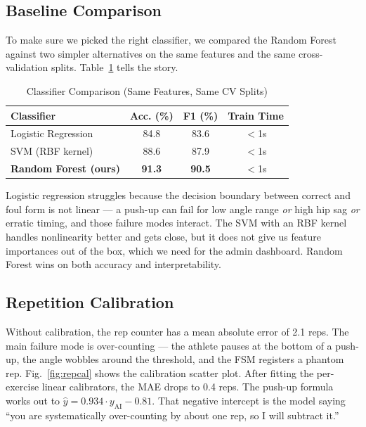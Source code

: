 \documentclass[conference]{IEEEtran}
\begin{document}
\subsection{Baseline Comparison}

To make sure we picked the right classifier, we compared the Random Forest against two simpler alternatives on the same features and the same cross-validation splits. Table~\ref{tab:baselines} tells the story.

\begin{table}[ht]
\caption{Classifier Comparison (Same Features, Same CV Splits)}
\label{tab:baselines}
\centering
\renewcommand{\arraystretch}{1.15}
\begin{tabular}{@{}lccc@{}}
\toprule
\textbf{Classifier} & \textbf{Acc. (\%)} & \textbf{F1 (\%)} & \textbf{Train Time} \\
\midrule
Logistic Regression & 84.8 & 83.6 & $<$1s \\
SVM (RBF kernel) & 88.6 & 87.9 & $<$1s \\
\textbf{Random Forest (ours)} & \textbf{91.3} & \textbf{90.5} & $<$1s \\
\bottomrule
\end{tabular}
\end{table}

Logistic regression struggles because the decision boundary between correct and foul form is not linear --- a push-up can fail for low angle range \textit{or} high hip sag \textit{or} erratic timing, and those failure modes interact. The SVM with an RBF kernel handles nonlinearity better and gets close, but it does not give us feature importances out of the box, which we need for the admin dashboard. Random Forest wins on both accuracy and interpretability.

\subsection{Repetition Calibration}
Without calibration, the rep counter has a mean absolute error of 2.1 reps. The main failure mode is over-counting --- the athlete pauses at the bottom of a push-up, the angle wobbles around the threshold, and the FSM registers a phantom rep. Fig.~\ref{fig:repcal} shows the calibration scatter plot. After fitting the per-exercise linear calibrators, the MAE drops to 0.4 reps. The push-up formula works out to $\hat{y} = 0.934 \cdot y_\text{AI} - 0.81$. That negative intercept is the model saying ``you are systematically over-counting by about one rep, so I will subtract it.''
\end{document}
